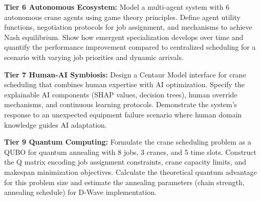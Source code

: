 \documentclass{article}
\begin{document}
\textbf{Tier 6 Autonomous Ecosystem:} Model a multi-agent system with 6 autonomous crane agents using game theory principles. Define agent utility functions, negotiation protocols for job assignment, and mechanisms to achieve Nash equilibrium. Show how emergent specialization develops over time and quantify the performance improvement compared to centralized scheduling for a scenario with varying job priorities and dynamic arrivals.
    
\textbf{Tier 7 Human-AI Symbiosis:} Design a Centaur Model interface for crane scheduling that combines human expertise with AI optimization. Specify the explainable AI components (SHAP values, decision trees), human override mechanisms, and continuous learning protocols. Demonstrate the system's response to an unexpected equipment failure scenario where human domain knowledge guides AI adaptation.
    
\textbf{Tier 9 Quantum Computing:} Formulate the crane scheduling problem as a QUBO for quantum annealing with 8 jobs, 3 cranes, and 5 time slots. Construct the Q matrix encoding job assignment constraints, crane capacity limits, and makespan minimization objectives. Calculate the theoretical quantum advantage for this problem size and estimate the annealing parameters (chain strength, annealing schedule) for D-Wave implementation.
\end{document}
